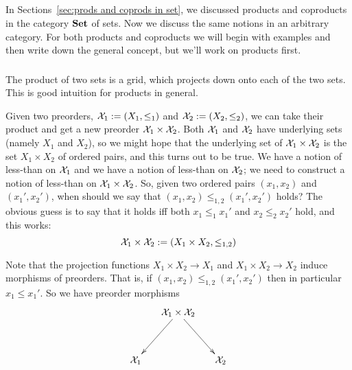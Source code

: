 \documentclass[CT4S-EN-RU]{subfiles}
\begin{document}

\subsection{}

\begin{blockENG}
In Sections~\ref{sec:prods and coprods in set}, we discussed products and coproducts in the category ${\mathbf{Set}}$ of sets. Now we discuss the same notions in an arbitrary category. For both products and coproducts we will begin with examples and then write down the general concept, but we'll work on products first.
\end{blockENG}

\begin{blockRUS}
\end{blockRUS}


\subsubsection{}

\begin{blockENG}
The product of two sets is a grid, which projects down onto each of the two sets. This is good intuition for products in general.
\end{blockENG}

\begin{blockRUS}
\end{blockRUS}

\begin{exampleENG}\label{ex:product of preorders}
Given two preorders, $\mathcal{X}_1:=(X_1,\leq_1)$ and $\mathcal{X}_2:=(X_2,\leq_2)$, we can take their product and get a new preorder $\mathcal{X}_1\times\mathcal{X}_2$. Both $\mathcal{X}_1$ and $\mathcal{X}_2$ have underlying sets (namely $X_1$ and $X_2$), so we might hope that the underlying set of $\mathcal{X}_1\times\mathcal{X}_2$ is the set $X_1\times X_2$ of ordered pairs, and this turns out to be true. We have a notion of less-than on $\mathcal{X}_1$ and we have a notion of less-than on $\mathcal{X}_2$; we need to construct a notion of less-than on $\mathcal{X}_1\times\mathcal{X}_2$. So, given two ordered pairs $(x_1,x_2)$ and $(x_1',x_2')$, when should we say that $(x_1,x_2)\leq_{1,2}(x_1',x_2')$ holds? The obvious guess is to say that it holds iff both $x_1\leq_1x_1'$ and $x_2\leq_2x_2'$ hold, and this works:
$$\mathcal{X}_1\times\mathcal{X}_2:=(X_1\times X_2,\leq_{1,2})$$

Note that the projection functions $X_1\times X_2\to X_1$ and $X_1\times X_2\to X_2$ induce morphisms of preorders. That is, if $(x_1,x_2)\leq_{1,2}(x_1',x_2')$ then in particular $x_1\leq x_1'$. So we have preorder morphisms
$$\xymatrix@=15pt{&\mcX_1\times\mcX_2\ar[ldd]\ar[rdd]\\\\\mcX_1&&\mcX_2}$$
\end{exampleENG}
\end{document}
